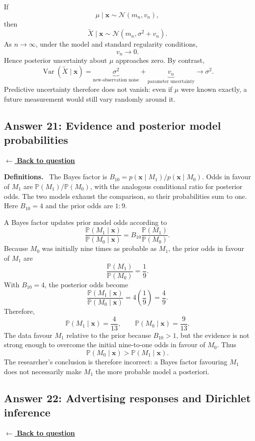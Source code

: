 \documentclass[11pt,a4paper]{article}
\newcommand{\given}{\mathrel{|}}
\newcommand{\xvec}{\boldsymbol{x}}
\newcommand{\answernav}[1]{%
  \label{answer:#1}%
  \noindent\hyperref[question:#1]{$\leftarrow$ \textbf{Back to question}}%
  \par\smallskip}
\newcommand{\studyheading}[1]{%
  \par\medskip\noindent\textcolor{statblue}{\textbf{#1.}}\ }
\begin{document}
If
\[
\mu\mid\xvec\sim\mathcal{N}(m_n,v_n),
\]
then
\[
\boxed{
\widetilde X\mid\xvec
\sim\mathcal{N}(m_n,\sigma^2+v_n).
}
\]
As $n\to\infty$, under the model and standard regularity conditions,
\[
v_n\longrightarrow0.
\]
Hence posterior uncertainty about $\mu$ approaches zero. By contrast,
\[
\operatorname{Var}(\widetilde X\mid\xvec)
=\underbrace{\sigma^2}_{\text{new-observation noise}}
+\underbrace{v_n}_{\text{parameter uncertainty}}
\longrightarrow\sigma^2.
\]
Predictive uncertainty therefore does not vanish: even if $\mu$ were known
exactly, a future measurement would still vary randomly around it.

\clearpage

\subsection{Answer 21: Evidence and posterior model probabilities}
\answernav{21}

\studyheading{Definitions}
The Bayes factor is
$B_{10}=p(\xvec\given M_1)/p(\xvec\given M_0)$.
Odds in favour of $M_1$ are $\mathbb P(M_1)/\mathbb P(M_0)$, with the analogous conditional ratio for posterior odds.
The two models exhaust the comparison, so their probabilities sum to one.
Here $B_{10}=4$ and the prior odds are $1:9$.

A Bayes factor updates prior model odds according to
\[
\frac{\mathbb{P}(M_1\mid\xvec)}{\mathbb{P}(M_0\mid\xvec)}
=B_{10}
\frac{\mathbb{P}(M_1)}{\mathbb{P}(M_0)}.
\]
Because $M_0$ was initially nine times as probable as $M_1$, the prior odds
in favour of $M_1$ are
\[
\frac{\mathbb{P}(M_1)}{\mathbb{P}(M_0)}=\frac19.
\]
With $B_{10}=4$, the posterior odds become
\[
\boxed{
\frac{\mathbb{P}(M_1\mid\xvec)}{\mathbb{P}(M_0\mid\xvec)}
=4\left(\frac19\right)=\frac49.
}
\]
Therefore,
\[
\mathbb{P}(M_1\mid\xvec)=\frac4{13},
\qquad
\mathbb{P}(M_0\mid\xvec)=\frac9{13}.
\]
The data favour $M_1$ relative to the prior because $B_{10}>1$, but the
evidence is not strong enough to overcome the initial nine-to-one odds in
favour of $M_0$. Thus
\[
\boxed{
\mathbb{P}(M_0\mid\xvec)>
\mathbb{P}(M_1\mid\xvec).
}
\]
The researcher's conclusion is therefore incorrect: a Bayes factor favouring
$M_1$ does not necessarily make $M_1$ the more probable model a posteriori.

\clearpage

\subsection{Answer 22: Advertising responses and Dirichlet inference}
\answernav{22}
\end{document}

